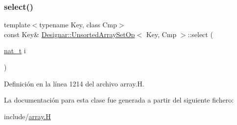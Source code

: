\subsubsection{\texorpdfstring{select()}{select()}}
{\footnotesize\ttfamily template$<$typename Key, class Cmp$>$ \\
const Key\& \hyperlink{class_designar_1_1_unsorted_array_set_op}{Designar\+::\+Unsorted\+Array\+Set\+Op}$<$ Key, Cmp $>$\+::select (\begin{DoxyParamCaption}\item[{\hyperlink{namespace_designar_aa72662848b9f4815e7bf31a7cf3e33d1}{nat\+\_\+t}}]{i }\end{DoxyParamCaption})\hspace{0.3cm}{\ttfamily [inline]}}



Definición en la línea 1214 del archivo array.\+H.



La documentación para esta clase fue generada a partir del siguiente fichero\+:\begin{DoxyCompactItemize}
\item 
include/\hyperlink{array_8_h}{array.\+H}\end{DoxyCompactItemize}
